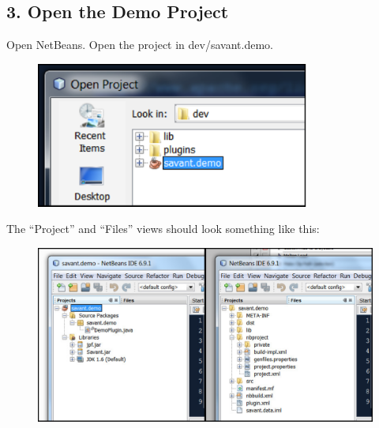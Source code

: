 \documentclass[times,11pt]{report}
\begin{document}
\subsection*{3. Open the Demo Project}
Open NetBeans. Open the project in dev/savant.demo.

\begin{figure}[h]
\begin{center}
\includegraphics[type=png,ext=.png,read=.png,width=9cm]{images/OpenProject}
\end{center}
\end{figure}
\newpage
The ``Project'' and ``Files'' views should look something like this:
\begin{figure}[h]
\begin{center}
\includegraphics[type=png,ext=.png,read=.png,width=15cm]{images/ProjectAndFiles}
\end{center}
\end{figure}
\end{document}

